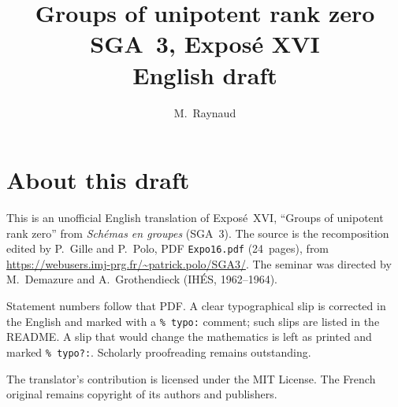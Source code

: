 \documentclass[11pt,a4paper,oneside]{amsbook}
\title[SGA~3, Expos\'e XVI (English draft)]{Groups of unipotent rank zero\\
{\normalsize SGA~3, Expos\'e XVI\\English draft}}
\author{M.\ Raynaud}
\date{}
\begin{document}
\frontmatter
\maketitle

\chapter*{About this draft}
This is an unofficial English translation of Expos\'e~XVI, ``Groups of unipotent rank zero''
from \textit{Sch\'emas en groupes} (SGA~3).
The source is the recomposition edited by P.~Gille and P.~Polo,
PDF \texttt{Expo16.pdf} (24~pages),
from \url{https://webusers.imj-prg.fr/~patrick.polo/SGA3/}.
The seminar was directed by M.~Demazure and A.~Grothendieck
(IH\'ES, 1962--1964).

Statement numbers follow that PDF. A clear typographical slip is
corrected in the English and marked with a \texttt{\% typo:} comment;
such slips are listed in the README. A slip that would change the
mathematics is left as printed and marked \texttt{\% typo?:}.
Scholarly proofreading remains outstanding.

The translator's contribution is licensed under the MIT License.
The French original remains copyright of its authors and publishers.

\tableofcontents
\mainmatter




\end{document}
